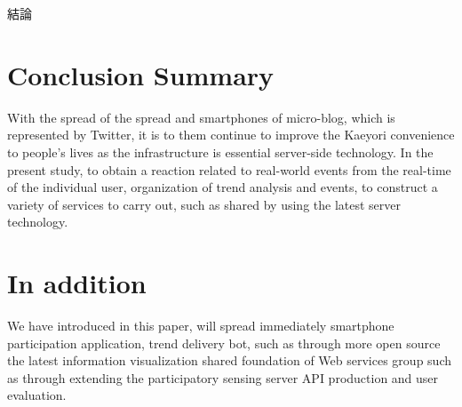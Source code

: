 \chapterhead
{結論}


\section{Conclusion Summary}
With the spread of the spread and smartphones of micro-blog, which is represented by Twitter, it is to them continue to improve the Kaeyori convenience to people's lives as the infrastructure is essential server-side technology. In the present study, to obtain a reaction related to real-world events from the real-time of the individual user, organization of trend analysis and events, to construct a variety of services to carry out, such as shared by using the latest server technology.

\section{In addition}
We have introduced in this paper, will spread immediately smartphone participation application, trend delivery bot, such as through more open source the latest information visualization shared foundation of Web services group such as through extending the participatory sensing server API production and user evaluation.
